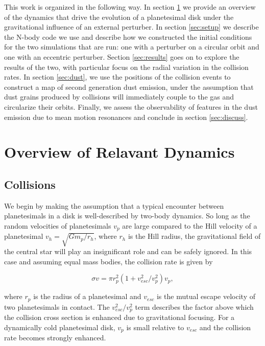 \documentclass[twocolumn]{aastex63}
\begin{document}
This work is organized in the following way. In section \ref{sec:dynamics} we provide an overview of the dynamics that drive the 
evolution of a planetesimal disk under the gravitational influence of an external perturber. In section \ref{sec:setup} we describe the 
N-body code we use and describe how we constructed the initial conditions for the two simulations that are run: one with a perturber 
on a circular orbit and one with an eccentric perturber. Section \ref{sec:results} goes on to explore the results of the two, with 
particular focus on the radial variation in the collision rates. In section \ref{sec:dust}, we use the positions of the collision events to 
construct a map of second generation dust emission, under the assumption that dust grains produced by collisions will immediately 
couple to the gas and circularize their orbits. Finally, we assess the observability of features in the dust emission due to mean motion 
resonances and conclude in section \ref{sec:discuss}.

\section{Overview of Relavant Dynamics} \label{sec:dynamics}

\subsection{Collisions}

We begin by making the assumption that a typical encounter between planetesimals in a disk is well-described by two-body 
dynamics. So long as the random velocities of planetesimals $v_{p}$ are large compared to the Hill velocity of a planetesimal $v_{h} 
= \sqrt{G m_{p} / r_{h}}$, where $r_{h}$ is the Hill radius, the gravitational field of the central star will play an insignificant role and 
can be safely ignored. In this case and assuming equal mass bodies, the collision rate is given by \citep{1967SvA....10..650S}

\begin{equation}\label{eq:safronov}
	\sigma v = \pi r_{p}^2 \left( 1 + v_{esc}^2/v_{p}^2 \right) v_{p},
\end{equation}

\noindent where $r_{p}$ is the radius of a planetesimal and $v_{esc}$ is the mutual escape velocity of two planetesimals in contact. 
The $v_{esc}^2/v_{p}^2$ term describes the factor above which the collision cross section is enhanced due to gravitational focusing. 
For a dynamically cold planetesimal disk, $v_{p}$ is small relative to $v_{esc}$ and the collision rate becomes strongly enhanced.
\end{document}
